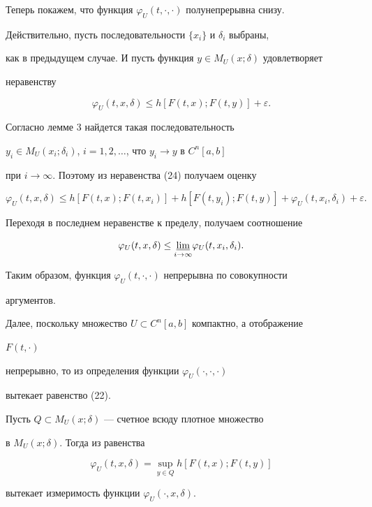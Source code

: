\begin{pf}
Теперь покажем, что функция $\varphi_U(t,\cdot,\cdot)$ полунепрерывна снизу.


Действительно, пусть последовательности $\{x_i\}$ и $\delta_i$ выбраны,


как в предыдущем случае. И пусть функция $y\in M_U(x;\delta)$ удовлетворяет


неравенству


\begin{equation}


\varphi_U(t,x,\delta)\le h[F(t,x);F(t,y)]+\varepsilon.


\end{equation}


Согласно лемме 3 найдется такая последовательность


$y_i\in M_U(x_i;\delta_i)$, $i=1,2,\dotsc$, что $y_i\to y$ в $C^n[a,b]$


при $i\to\infty$. Поэтому из неравенства (24) получаем оценку


$$


\varphi_U(t,x,\delta)\le h[F(t,x);F(t,x_i)]+h[F(t,y_i);F(t,y)]+


\varphi_U(t,x_i,\delta_i)+\varepsilon.


$$


Переходя в последнем неравенстве к пределу, получаем соотношение


$$


\varphi_U(t,x,\delta)\le\underset{i\to\infty}{\varliminf}{}


\varphi_U(t,x_i,\delta_i).


$$


Таким образом, функция $\varphi_U(t,\cdot,\cdot)$ непрерывна по совокупности


аргументов.





Далее, поскольку множество $U\subset C^n[a,b]$ компактно, а отображение


$F(t,\cdot)$


непрерывно, то из определения функции $\varphi_U(\cdot,\cdot,\cdot)$


вытекает равенство (22).





Пусть $Q\subset M_U(x;\delta)$ --- счетное всюду плотное множество


в $M_U(x;\delta)$. Тогда из равенства


$$


\varphi_U(t,x,\delta)=\sup_{y\in Q}h[F(t,x);F(t,y)]


$$


вытекает измеримость функции $\varphi_U(\cdot,x,\delta)$.


\end{pf}





